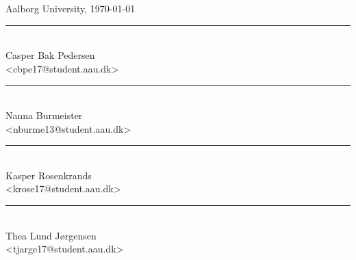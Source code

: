 
\vspace{\baselineskip}\hfill Aalborg University, \today
\vfill\noindent
\begin{minipage}[b]{0.45\textwidth}
 \centering
 \rule{\textwidth}{0.5pt}\\
  Casper Bak Pedersen\\
 {\footnotesize <cbpe17@student.aau.dk>}\\
 \vspace{2\baselineskip}
 \rule{\textwidth}{0.5pt}\\
  Nanna Burmeister\\
 {\footnotesize <nburme13@student.aau.dk>}
\end{minipage}
\hfill
\begin{minipage}[b]{0.45\textwidth}
 \centering
 \rule{\textwidth}{0.5pt}\\
  Kasper Rosenkrands\\
 {\footnotesize <krose17@student.aau.dk>}\\
 \vspace{2\baselineskip}
 \rule{\textwidth}{0.5pt}\\
  Thea Lund Jørgensen\\
 {\footnotesize <tjarge17@student.aau.dk>}
\end{minipage}